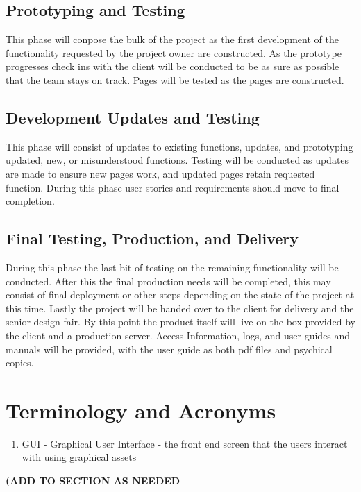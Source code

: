 \subsection{Prototyping and Testing}
This phase will conpose the bulk of the project as the first development of the functionality requested by the project owner are constructed. As the prototype progresses check ins with the client will be conducted to be as sure as possible that the team stays on track. Pages will be tested as the pages are constructed.

\subsection{Development Updates and Testing}
This phase will consist of updates to existing functions, updates, and prototyping updated, new, or misunderstood functions. Testing will be conducted as updates are made to ensure new pages work, and updated pages retain requested function. During this phase user stories and requirements should move to final completion.

\subsection{Final Testing, Production, and Delivery}
During this phase the last bit of testing on the remaining functionality will be conducted. After this the final production needs will be completed, this may consist of final deployment or other steps depending on the state of the project at this time. Lastly the project will be handed over to the client for delivery and the senior design fair. By this point the product itself will live on the box provided by the client and a production server. Access Information, logs, and user guides and manuals will be provided, with the user guide as both pdf files and psychical copies.


\section{Terminology and Acronyms}
\begin{enumerate}
\item GUI - Graphical User Interface - the front end screen that the users interact with using graphical assets
\end{enumerate}
\bf(ADD TO SECTION AS NEEDED 
